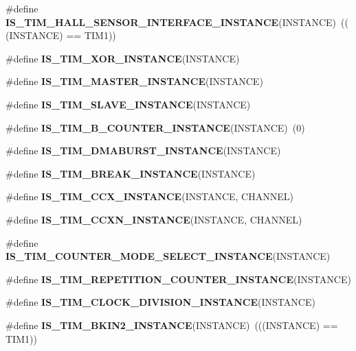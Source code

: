 \begin{DoxyCompactItemize}
\#define {\bfseries I\+S\+\_\+\+T\+I\+M\+\_\+\+H\+A\+L\+L\+\_\+\+S\+E\+N\+S\+O\+R\+\_\+\+I\+N\+T\+E\+R\+F\+A\+C\+E\+\_\+\+I\+N\+S\+T\+A\+N\+CE}(I\+N\+S\+T\+A\+N\+CE)~(((I\+N\+S\+T\+A\+N\+CE) == T\+I\+M1))
\item 
\#define {\bfseries I\+S\+\_\+\+T\+I\+M\+\_\+\+X\+O\+R\+\_\+\+I\+N\+S\+T\+A\+N\+CE}(I\+N\+S\+T\+A\+N\+CE)
\item 
\#define {\bfseries I\+S\+\_\+\+T\+I\+M\+\_\+\+M\+A\+S\+T\+E\+R\+\_\+\+I\+N\+S\+T\+A\+N\+CE}(I\+N\+S\+T\+A\+N\+CE)
\item 
\#define {\bfseries I\+S\+\_\+\+T\+I\+M\+\_\+\+S\+L\+A\+V\+E\+\_\+\+I\+N\+S\+T\+A\+N\+CE}(I\+N\+S\+T\+A\+N\+CE)
\item 
\mbox{\label{group___exported__macro_gac41867bf288927ff8ff10a85e67a591b}} 
\#define {\bfseries I\+S\+\_\+\+T\+I\+M\+\_\+B\+\_\+\+C\+O\+U\+N\+T\+E\+R\+\_\+\+I\+N\+S\+T\+A\+N\+CE}(I\+N\+S\+T\+A\+N\+CE)~(0)
\item 
\#define {\bfseries I\+S\+\_\+\+T\+I\+M\+\_\+\+D\+M\+A\+B\+U\+R\+S\+T\+\_\+\+I\+N\+S\+T\+A\+N\+CE}(I\+N\+S\+T\+A\+N\+CE)
\item 
\#define {\bfseries I\+S\+\_\+\+T\+I\+M\+\_\+\+B\+R\+E\+A\+K\+\_\+\+I\+N\+S\+T\+A\+N\+CE}(I\+N\+S\+T\+A\+N\+CE)
\item 
\#define {\bfseries I\+S\+\_\+\+T\+I\+M\+\_\+\+C\+C\+X\+\_\+\+I\+N\+S\+T\+A\+N\+CE}(I\+N\+S\+T\+A\+N\+CE,  C\+H\+A\+N\+N\+EL)
\item 
\#define {\bfseries I\+S\+\_\+\+T\+I\+M\+\_\+\+C\+C\+X\+N\+\_\+\+I\+N\+S\+T\+A\+N\+CE}(I\+N\+S\+T\+A\+N\+CE,  C\+H\+A\+N\+N\+EL)
\item 
\#define {\bfseries I\+S\+\_\+\+T\+I\+M\+\_\+\+C\+O\+U\+N\+T\+E\+R\+\_\+\+M\+O\+D\+E\+\_\+\+S\+E\+L\+E\+C\+T\+\_\+\+I\+N\+S\+T\+A\+N\+CE}(I\+N\+S\+T\+A\+N\+CE)
\item 
\#define {\bfseries I\+S\+\_\+\+T\+I\+M\+\_\+\+R\+E\+P\+E\+T\+I\+T\+I\+O\+N\+\_\+\+C\+O\+U\+N\+T\+E\+R\+\_\+\+I\+N\+S\+T\+A\+N\+CE}(I\+N\+S\+T\+A\+N\+CE)
\item 
\#define {\bfseries I\+S\+\_\+\+T\+I\+M\+\_\+\+C\+L\+O\+C\+K\+\_\+\+D\+I\+V\+I\+S\+I\+O\+N\+\_\+\+I\+N\+S\+T\+A\+N\+CE}(I\+N\+S\+T\+A\+N\+CE)
\item 
\mbox{\label{group___exported__macro_ga64ee0eb39ee44221618c397a8f74c7b8}} 
\#define {\bfseries I\+S\+\_\+\+T\+I\+M\+\_\+\+B\+K\+I\+N2\+\_\+\+I\+N\+S\+T\+A\+N\+CE}(I\+N\+S\+T\+A\+N\+CE)~(((I\+N\+S\+T\+A\+N\+CE) == T\+I\+M1))

\end{DoxyCompactItemize}
